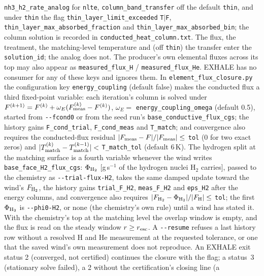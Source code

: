 \documentclass[english,a4paper]{my_memo}
\begin{document}
\texttt{nh3\_h2\_rate\_analog} for \texttt{nlte},
\texttt{column\_band\_transfer} off the default \texttt{thin}, and under
\texttt{thin} the flag \texttt{thin\_layer\_}\allowbreak\texttt{limit\_exceeded} \texttt{T}$|$\texttt{F},
\texttt{thin\_layer\_max\_}\allowbreak\texttt{absorbed\_fraction} and
\texttt{thin\_layer\_max\_}\allowbreak\texttt{absorbed\_bin}; the column solution is recorded in
\texttt{conducted\_heat\_column.txt}. The flux, the treatment, the
matching-level temperature and (off \texttt{thin}) the transfer enter the
\texttt{solution\_id}; the analog does not. The producer's own elemental
fluxes across its top may also appear as \texttt{measured\_flux\_H} /
\texttt{measured\_flux\_He}. EXHALE has no consumer for any of these keys and
ignores them. In \texttt{element\_flux\_closure.py} the configuration key
\texttt{energy\_coupling} (default false) makes the conducted flux a third
fixed-point variable: each iteration's column is solved under
$F^{(k+1)}=F^{(k)}+\omega_E(F^{(k)}_{\rm meas}-F^{(k)})$,
$\omega_E=$ \texttt{energy\_coupling\_omega} (default 0.5), started from
\texttt{-{}-fcond0} or from the seed run's \texttt{base\_conductive\_flux\_cgs};
the history gains \texttt{F\_cond\_trial}, \texttt{F\_cond\_meas} and
\texttt{T\_match}; and convergence also requires the conducted-flux residual
$|F_{\rm meas}-F|/|F_{\rm meas}|\le$ \texttt{tol} (0 for two exact zeros)
and $|T_{\rm match}^{(k)}-T_{\rm match}^{(k-1)}|<$ \texttt{T\_match\_tol}
(default 6\,K). The hydrogen split at the matching surface is a fourth
variable whenever the wind writes \texttt{base\_face\_H2\_flux\_cgs}:
$\Phi_{\rm H_2}$ [g\,s$^{-1}$ of the hydrogen nuclei H$_2$ carries], passed to
the chemistry as \texttt{-{}-trial-flux-H2}, takes the same damped update
toward the wind's $F_{\rm H_2}$, the history gains \texttt{trial\_F\_H2},
\texttt{meas\_F\_H2} and \texttt{eps\_H2} after the energy columns, and
convergence also requires $|F_{\rm H_2}-\Phi_{\rm H_2}|/|F_{\rm H}|\le$
\texttt{tol}; the first $\Phi_{\rm H_2}$ is \texttt{-{}-phi0-H2}, or none
(the chemistry's own rule) until a wind has stated it. With the chemistry's
top at the matching level the overlap window is empty, and the flux is read
on the steady window $r\ge r_{\rm esc}$. A \texttt{-{}-resume} refuses a last history row without a
resolved H and He measurement at the requested tolerance, or one that the
saved wind's own measurement does not reproduce. An EXHALE exit status 2
(converged, not certified) continues the closure with the flag; a status~3
(stationary solve failed), a 2 without the certification's closing line (a
\end{document}
